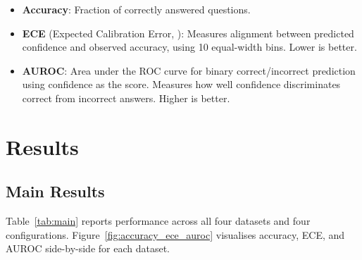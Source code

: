 \documentclass[10pt]{article}
\begin{document}
\begin{itemize}
    \item \textbf{Accuracy}: Fraction of correctly answered questions.
    \item \textbf{ECE} (Expected Calibration Error, \citealt{guo2017calibration}):
          Measures alignment between predicted confidence and observed accuracy,
          using 10 equal-width bins.  Lower is better.
    \item \textbf{AUROC}: Area under the ROC curve for binary correct/incorrect
          prediction using confidence as the score.  Measures how well
          confidence discriminates correct from incorrect answers.  Higher
          is better.
\end{itemize}

\section{Results}
\label{sec:results}

\subsection{Main Results}

Table~\ref{tab:main} reports performance across all four datasets and four
configurations.  Figure~\ref{fig:accuracy_ece_auroc} visualises accuracy,
ECE, and AUROC side-by-side for each dataset.
\end{document}
